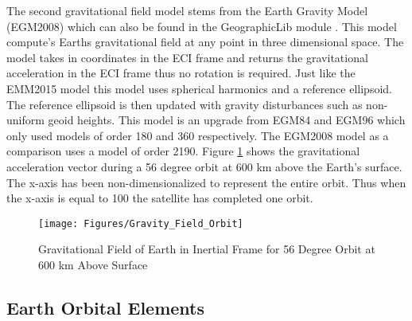 \documentclass{article}
\begin{document}
The second gravitational field model stems from the
Earth Gravity Model (EGM2008) \cite{EGM2008} which can also be found
in the GeographicLib module \cite{GeographicLib}. This model compute's
Earths gravitational field at any point in three dimensional
space. The model takes in coordinates in the ECI frame and returns the
gravitational acceleration in the ECI frame thus no rotation is
required. Just like the EMM2015 model this model uses spherical
harmonics and a reference ellipsoid. The reference ellipsoid is then
updated with gravity disturbances such as non-uniform geoid
heights. This model is an upgrade from EGM84 and EGM96 which only
used models of order 180 and 360 respectively. The EGM2008 model as a
comparison uses a model of order 2190. Figure \ref{f:grav_orbit} shows
the gravitational acceleration vector during a 56 degree orbit at 600 km above the
Earth's surface. The x-axis has been non-dimensionalized to 
represent the entire orbit. Thus when the x-axis is equal to 100 the
satellite has completed one orbit.
\begin{figure}[H]
  \begin{center}
  \texttt{[image: Figures/Gravity\_Field\_Orbit]}
  \end{center}
  \caption{Gravitational Field of Earth in Inertial Frame for 56 Degree
    Orbit at 600 km Above Surface}\label{f:grav_orbit}
\end{figure}

\subsection{Earth Orbital Elements}\label{s:ephemeris}
\end{document}
